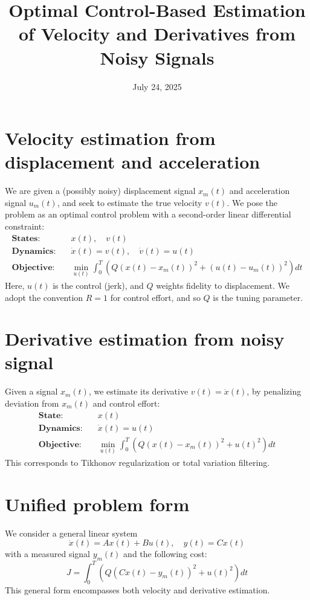 \documentclass[11pt]{article}
\title{Optimal Control-Based Estimation of Velocity and Derivatives from Noisy Signals}
\author{}
\date{July 24, 2025}
\begin{document}
\maketitle

\section{Velocity estimation from displacement and acceleration}

We are given a (possibly noisy) displacement signal $x_m(t)$ and acceleration signal $u_m(t)$, 
and seek to estimate the true velocity $v(t)$. 
We pose the problem as an optimal control problem with a second-order linear differential constraint:
\begin{align*}
    \textbf{States:} \quad & x(t), \quad v(t) \\
    \textbf{Dynamics:} \quad & \dot{x}(t) = v(t), \quad \dot{v}(t) = u(t) \\
    \textbf{Objective:} \quad & \min_{u(t)} \int_0^T \left( Q (x(t) - x_m(t))^2 + (u(t) - u_m(t))^2 \right) dt
\end{align*}
Here, $u(t)$ is the control (jerk), and $Q$ weights fidelity to displacement. 
We adopt the convention $R = 1$ for control effort, and so $Q$ is the tuning parameter.

\section{Derivative estimation from noisy signal}

Given a signal $x_m(t)$, we estimate its derivative $v(t) = \dot{x}(t)$, 
by penalizing deviation from $x_m(t)$ and control effort:
\begin{align*}
    \textbf{State:} \quad & x(t) \\
    \textbf{Dynamics:} \quad & \dot{x}(t) = u(t) \\
    \textbf{Objective:} \quad & \min_{u(t)} \int_0^T \left( Q (x(t) - x_m(t))^2 + u(t)^2 \right) dt
\end{align*}
This corresponds to Tikhonov regularization or total variation filtering.

\section{Unified problem form}

We consider a general linear system
\[
\dot{x}(t) = A x(t) + B u(t), \quad y(t) = C x(t)
\]
with a measured signal $y_m(t)$ and the following cost:
\[
J = \int_0^T \left( Q (C x(t) - y_m(t))^2 + u(t)^2 \right) dt
\]
This general form encompasses both velocity and derivative estimation.
\end{document}
